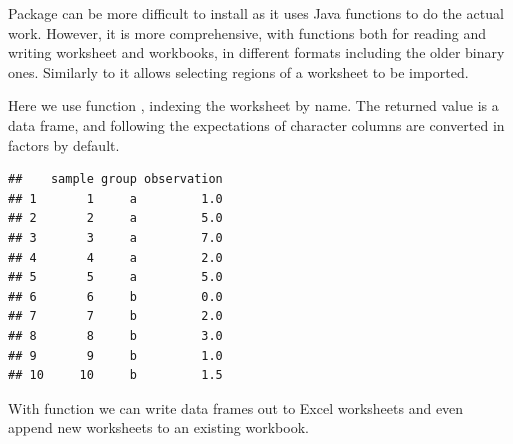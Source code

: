 \documentclass[krantz2]{krantz}\usepackage{knitr}%
\begin{document}
Package  can be more difficult to install as it uses Java functions to do the actual work. However, it is more comprehensive, with functions both for reading and writing  worksheet and workbooks, in different formats including the older binary ones. Similarly to  it allows selecting regions of a worksheet to be imported.

Here we use function , indexing the worksheet by name. The returned value is a data frame, and following the expectations of \Rlang {} character columns are converted in factors by default.

\begin{knitrout}\footnotesize
{}\color{fgcolor}\begin{kframe}
\begin{alltt}
 \hlkwb{<-} \hlstd{(}\hlstd{,}  \hlstd{=} \hlstd{)}
\end{alltt}
\begin{verbatim}
##    sample group observation
## 1       1     a         1.0
## 2       2     a         5.0
## 3       3     a         7.0
## 4       4     a         2.0
## 5       5     a         5.0
## 6       6     b         0.0
## 7       7     b         2.0
## 8       8     b         3.0
## 9       9     b         1.0
## 10     10     b         1.5
\end{verbatim}
\end{kframe}
\end{knitrout}

With function  we can write data frames out to Excel worksheets and even append new worksheets to an existing workbook.

\begin{knitrout}\footnotesize
{}\color{fgcolor}\begin{kframe}
\begin{alltt}
\hlstd{(}\hlstd{)}
 \hlkwb{<-} \hlstd{(} \hlstd{=} \hlopt{:}\hlstd{,}  \hlstd{= letters[}\hlopt{:}\hlstd{])}
  \hlstd{=} \hlstd{,}  \hlstd{=} \hlstd{)}
  \hlstd{=} \hlstd{,}  \hlstd{=} \hlstd{,}  \hlstd{=} \hlstd{)}
\end{alltt}
\end{kframe}
\end{knitrout}
\end{document}
